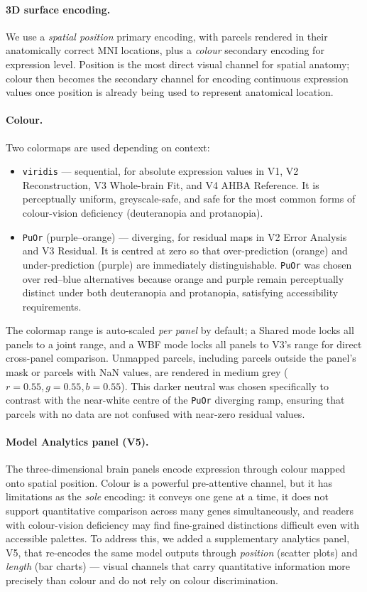 \documentclass[11pt,letterpaper]{article}
\begin{document}
\paragraph{3D surface encoding.}
We use a \emph{spatial position} primary encoding, with parcels rendered in
their anatomically correct MNI locations, plus a \emph{colour} secondary
encoding for expression level.
Position is the most direct visual channel for spatial anatomy; colour then
becomes the secondary channel for encoding continuous expression values once
position is already being used to represent anatomical location.

\paragraph{Colour.}
Two colormaps are used depending on context:
\begin{itemize}[nosep]
  \item \texttt{viridis} — sequential, for absolute expression values
        in V1, V2 Reconstruction, V3 Whole-brain Fit, and V4 AHBA Reference.
        It is perceptually uniform, greyscale-safe, and safe for the most
        common forms of colour-vision deficiency (deuteranopia and protanopia).
  \item \texttt{PuOr} (purple--orange) — diverging, for residual maps
        in V2 Error Analysis and V3 Residual.
        It is centred at zero so that over-prediction (orange) and
        under-prediction (purple) are immediately distinguishable.
        \texttt{PuOr} was chosen over red--blue alternatives because orange
        and purple remain perceptually distinct under both deuteranopia and
        protanopia, satisfying accessibility requirements.
\end{itemize}
The colormap range is auto-scaled \emph{per panel} by default; a Shared
mode locks all panels to a joint range, and a WBF mode locks all panels
to V3's range for direct cross-panel comparison.
Unmapped parcels, including parcels outside the panel's mask or parcels with
NaN values, are rendered in medium grey ($r{=}0.55, g{=}0.55, b{=}0.55$).
This darker neutral was chosen specifically to contrast with the near-white
centre of the \texttt{PuOr} diverging ramp, ensuring that parcels with no
data are not confused with near-zero residual values.

\paragraph{Model Analytics panel (V5).}
The three-dimensional brain panels encode expression through colour mapped onto
spatial position.
Colour is a powerful pre-attentive channel, but it has limitations as the
\emph{sole} encoding: it conveys one gene at a time, it does not support
quantitative comparison across many genes simultaneously, and readers with
colour-vision deficiency may find fine-grained distinctions difficult even with
accessible palettes.
To address this, we added a supplementary analytics panel, V5, that re-encodes
the same model outputs through \emph{position} (scatter plots) and \emph{length}
(bar charts) — visual channels that carry quantitative information more
precisely than colour and do not rely on colour discrimination.
\end{document}
